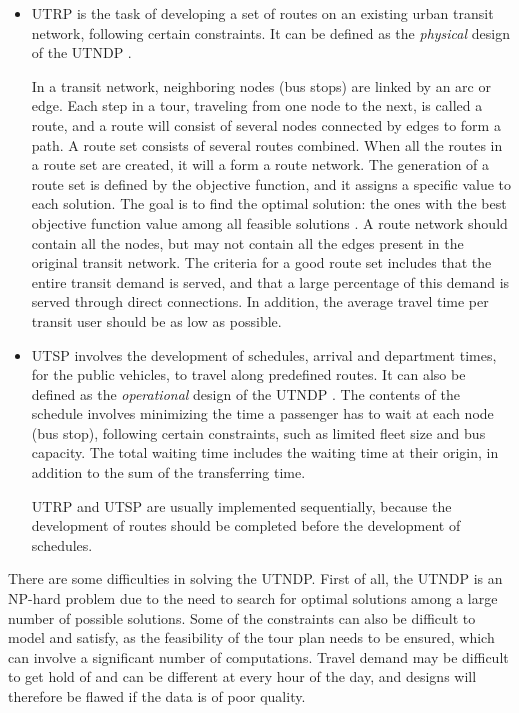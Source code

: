 \begin{itemize}
\item UTRP is the task of developing a set of routes on an existing urban transit network, following certain constraints. It can be defined as the \textit{physical} design of the UTNDP \citep{fan09}. 

In a transit network, neighboring nodes (bus stops) are linked by an arc or edge. Each step in a tour, traveling from one node to the next, is called a route, and a route will consist of several nodes connected by edges to form a path. A route set consists of several routes combined. When all the routes in a route set are created, it will a form a route network. The generation of a route set is defined by the objective function, and it assigns a specific value to each solution. The goal is to find the optimal solution: the ones with the best objective function value among all feasible solutions \citep{vehiclerouting}. A route network should contain all the nodes, but may not contain all the edges present in the original transit network. The criteria for a good route set includes that the entire transit demand is served, and that a large percentage of this demand is served through direct connections. In addition, the average travel time per transit user should be as low as possible. 

\item UTSP involves the development of schedules, arrival and department times, for the public vehicles, to travel along predefined routes. It can also be defined as the \textit{operational} design of the UTNDP \citep{fan09}. 
The contents of the schedule involves minimizing the time a passenger has to wait at each node (bus stop), following certain constraints, such as limited fleet size and bus capacity.  The total waiting time includes the waiting time at their origin, in addition to the sum of the transferring time.

UTRP and UTSP are usually implemented sequentially, because the development of routes should be completed before the development of schedules. 
\end{itemize}

There are some difficulties in solving the UTNDP. First of all, the UTNDP is an NP-hard problem due to the need to search for optimal solutions among a large number of possible solutions. Some of the constraints can also be difficult to model and satisfy, as the feasibility of the tour plan needs to be ensured, which can involve a significant number of computations. Travel demand may be difficult to get hold of and can be different at every hour of the day, and designs will therefore be flawed if the data is of poor quality.  

